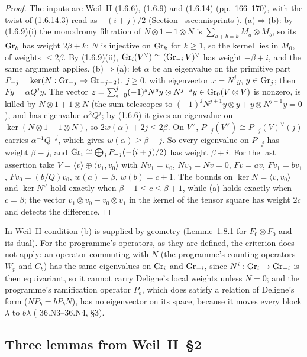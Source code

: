 \begin{proof}
The inputs are Weil~II (1.6.6), (1.6.9) and (1.6.14) (pp.~166--170), with the twist of (1.6.14.3) read as $-(i+j)/2$ (Section~\ref{ssec:misprints}).
(a)$\Rightarrow$(b): by (1.6.9)(i) the monodromy filtration of $N\otimes1+1\otimes N$ is $\sum_{a+b=k}M_a\otimes M_b$, so its $\operatorname{Gr}_k$ has weight $2\beta+k$; $N$ is injective on $\operatorname{Gr}_k$ for $k\ge1$, so the kernel lies in $M_0$, of weights $\le2\beta$. By (1.6.9)(ii), $\operatorname{Gr}_i(V^\vee)\cong(\operatorname{Gr}_{-i}V)^\vee$ has weight $-\beta+i$, and the same argument applies.
(b)$\Rightarrow$(a): let $\alpha$ be an eigenvalue on the primitive part $P_{-j}=\ker(N:\operatorname{Gr}_{-j}\to\operatorname{Gr}_{-j-2})$, $j\ge0$, with eigenvector $x=N^jy$, $y\in\operatorname{Gr}_j$; then $Fy=\alpha Q^jy$. The vector $z=\sum_{s=0}^j(-1)^sN^sy\otimes N^{j-s}y\in\operatorname{Gr}_0(V\otimes V)$ is nonzero, is killed by $N\otimes1+1\otimes N$ (the sum telescopes to $(-1)^jN^{j+1}y\otimes y+y\otimes N^{j+1}y=0$), and has eigenvalue $\alpha^2Q^j$; by (1.6.6) it gives an eigenvalue on $\ker(N\otimes1+1\otimes N)$, so $2w(\alpha)+2j\le2\beta$. On $V^\vee$, $P_{-j}(V^\vee)\cong P_{-j}(V)^\vee(j)$ carries $\alpha^{-1}Q^{-j}$, which gives $w(\alpha)\ge\beta-j$. So every eigenvalue on $P_{-j}$ has weight $\beta-j$, and $\operatorname{Gr}_i\cong\bigoplus_jP_{-j}(-(i+j)/2)$ has weight $\beta+i$.
For the last assertion take $V=\langle v\rangle\oplus\langle v_1,v_0\rangle$ with $Nv_1=v_0$, $Nv_0=Nv=0$, $Fv=av$, $Fv_1=bv_1$, $Fv_0=(b/Q)v_0$, $w(a)=\beta$, $w(b)=c+1$. The bounds on $\ker N=\langle v,v_0\rangle$ and $\ker N^\vee$ hold exactly when $\beta-1\le c\le\beta+1$, while (a) holds exactly when $c=\beta$; the vector $v_1\otimes v_0-v_0\otimes v_1$ in the kernel of the tensor square has weight $2c$ and detects the difference.
\end{proof}

In Weil~II condition (b) is supplied by geometry (Lemme~1.8.1 for $F_0\otimes F_0$ and its dual). For the programme's operators, as they are defined, the criterion does not apply: an operator commuting with $N$ (the programme's counting operators $W_p$ and $C_b$) has the same eigenvalues on $\operatorname{Gr}_i$ and $\operatorname{Gr}_{-i}$, since $N^i:\operatorname{Gr}_i\to\operatorname{Gr}_{-i}$ is then equivariant, so it cannot carry Deligne's local weights unless $N=0$; and the programme's ramification operator $P_b$, which does satisfy a relation of Deligne's form ($NP_b=bP_bN$), has no eigenvector on its space, because it moves every block $\lambda$ to $b\lambda$ ( 36.N3--36.N4,  §3).

\subsection{Three lemmas from Weil~II~§2}

